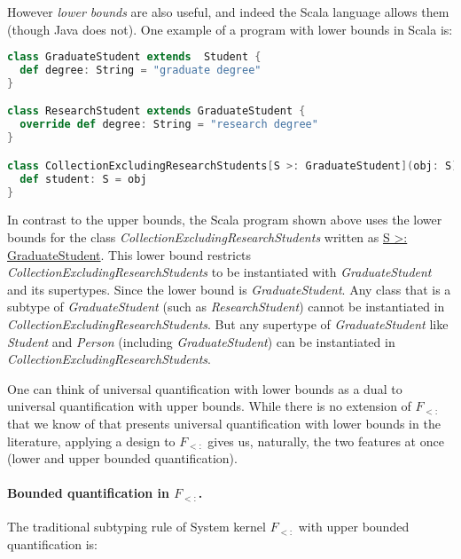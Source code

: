 \noindent However \emph{lower bounds} are also useful, and indeed the Scala language allows them
(though Java does not).  One example of a program with lower bounds in Scala is:

\begin{lstlisting}[language=Scala]
class GraduateStudent extends  Student {
  def degree: String = "graduate degree"
}

class ResearchStudent extends GraduateStudent {
  override def degree: String = "research degree"
}

class CollectionExcludingResearchStudents[S >: GraduateStudent](obj: S) {
  def student: S = obj
}
\end{lstlisting}

\noindent In contrast to the upper bounds, the
Scala program shown above uses the lower bounds for the class
\emph{CollectionExcludingResearchStudents} written as \underline{S >: GraduateStudent}.
This lower bound restricts \emph{CollectionExcludingResearchStudents} to be instantiated with \emph{GraduateStudent} and its supertypes.
Since the lower bound is \emph{GraduateStudent}.
Any class that is a subtype of \emph{GraduateStudent} (such as \emph{ResearchStudent})
cannot be instantiated in \emph{CollectionExcludingResearchStudents}.
But any supertype of \emph{GraduateStudent} like \emph{Student} and \emph{Person} (including \emph{GraduateStudent}) can be instantiated in
\emph{CollectionExcludingResearchStudents}.

One can think of universal quantification
with lower bounds as a dual to universal quantification with upper bounds. While
there is no extension of $F_{<:}$
that we know of that presents universal quantification with lower
bounds in the literature, applying a \nameduo design to $F_{<:}$ gives
us, naturally, the two features at once (lower and upper bounded quantification).


\paragraph{Bounded quantification in $F_{<:}$.}
The traditional subtyping rule of System kernel $F_{<:}$
with upper bounded quantification is:

